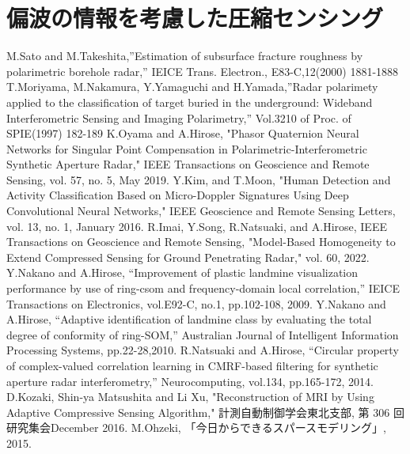 \documentclass[12pt,a4paper]{jsreport}
\begin{document}
\section{偏波の情報を考慮した圧縮センシング}

\clearpage

\begin{thebibliography}{99}
    M.Sato and M.Takeshita,”Estimation of subsurface fracture roughness by
    polarimetric borehole radar,” IEICE Trans. Electron., E83-C,12(2000) 1881-1888
    T.Moriyama, M.Nakamura, Y.Yamaguchi and H.Yamada,”Radar polarimety applied
    to the classification of target buried in the underground: Wideband Interferometric
    Sensing and Imaging Polarimetry,” Vol.3210 of Proc. of SPIE(1997) 182-189
     K.Oyama and A.Hirose, "Phasor Quaternion Neural Networks for Singular
     Point Compensation in Polarimetric-Interferometric
     Synthetic Aperture Radar," IEEE Transactions on Geoscience and Remote Sensing, vol. 57, no. 5, May 2019.
     Y.Kim, and T.Moon, "Human Detection and Activity Classification Based
     on Micro-Doppler Signatures Using Deep
     Convolutional Neural Networks," IEEE Geoscience and Remote Sensing Letters, vol. 13, no. 1, January 2016.
     R.Imai, Y.Song, R.Natsuaki, and A.Hirose, IEEE Transactions on Geoscience and Remote Sensing,
     "Model-Based Homogeneity to Extend Compressed Sensing for Ground Penetrating Radar," vol. 60, 2022.
     Y.Nakano and A.Hirose, “Improvement of plastic landmine visualization performance by use of ring-csom and frequency-domain local
     correlation,” IEICE Transactions on Electronics, vol.E92-C, no.1,
     pp.102-108, 2009.
     Y.Nakano and A.Hirose, “Adaptive identification of landmine class
     by evaluating the total degree of conformity of ring-SOM,” Australian
     Journal of Intelligent Information Processing Systems, pp.22-28,2010. %
    R.Natsuaki and A.Hirose, “Circular property of complex-valued
    correlation learning in CMRF-based filtering for synthetic aperture
    radar interferometry,” Neurocomputing, vol.134, pp.165-172, 2014.
    D.Kozaki, Shin-ya Matsushita and Li Xu, "Reconstruction of MRI by Using Adaptive Compressive Sensing
    Algorithm," 計測自動制御学会東北支部, 第 306 回研究集会December 2016.
    M.Ohzeki, 「今日からできるスパースモデリング」, 2015. 
   

\end{thebibliography}
\end{document}
